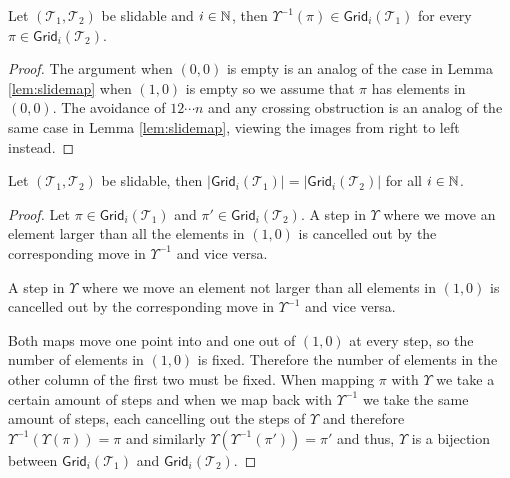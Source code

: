 \begin{lemma}
Let $(\mathcal{T}_1,\mathcal{T}_2)$ be slidable and $i \in \mathbb{N}$, then $\Upsilon^{-1}(\pi) \in \textsf{Grid}_i(\mathcal{T}_1)$ for every $\pi \in \textsf{Grid}_i(\mathcal{T}_2)$.
\end{lemma}
\begin{proof}
The argument when $(0,0)$ is empty is an analog of the case in Lemma \ref{lem:slidemap} when $(1,0)$ is empty so we assume that $\pi$ has elements in $(0,0)$. The avoidance of $12\cdots n$ and any crossing obstruction is an analog of the same case in Lemma \ref{lem:slidemap}, viewing the images from right to left instead.
\end{proof}

\begin{proposition}
Let $(\mathcal{T}_1,\mathcal{T}_2)$ be slidable, then $|\textsf{Grid}_i(\mathcal{T}_1)| = |\textsf{Grid}_i(\mathcal{T}_2)|$ for all $i\in\mathbb{N}$.
\end{proposition}
\begin{proof}
Let $\pi \in \textsf{Grid}_i(\mathcal{T}_1)$ and $\pi' \in \textsf{Grid}_i(\mathcal{T}_2)$. A step in $\Upsilon$ where we move an element larger than all the elements in $(1,0)$ is cancelled out by the corresponding move in $\Upsilon^{-1}$ and vice versa.

\begin{center}

\end{center}

A step in $\Upsilon$ where we move an element not larger than all elements in $(1,0)$ is cancelled out by the corresponding move in $\Upsilon^{-1}$ and vice versa.

\begin{center}

\end{center}

Both maps move one point into and one out of $(1,0)$ at every step, so the number of elements in $(1,0)$ is fixed. Therefore the number of elements in the other column of the first two must be fixed. When mapping $\pi$ with $\Upsilon$ we take a certain amount of steps and when we map back with $\Upsilon^{-1}$ we take the same amount of steps, each cancelling out the steps of $\Upsilon$ and therefore $\Upsilon^{-1}(\Upsilon(\pi)) = \pi$ and similarly $\Upsilon\left(\Upsilon^{-1}(\pi')\right) = \pi'$ and thus, $\Upsilon$ is a bijection between $\textsf{Grid}_i(\mathcal{T}_1)$ and $\textsf{Grid}_i(\mathcal{T}_2)$.
\end{proof}

